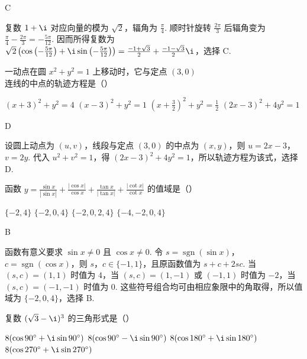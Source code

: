 \documentclass[UTF8,a4paper,oneside,11pt]{ctexbook}
\begin{document}
\begin{answer}
C
\end{answer}

\begin{solution}
复数 \(1+\i\) 对应向量的模为 \(\sqrt2\)，辐角为 \(\frac{\pi}{4}\). 顺时针旋转 \(\frac{2\pi}{3}\) 后辐角变为 \(\frac{\pi}{4}-\frac{2\pi}{3}=-\frac{5\pi}{12}\). 因而所得复数为
\(\sqrt2\left(\cos\left(-\frac{5\pi}{12}\right)+\i\sin\left(-\frac{5\pi}{12}\right)\right)=\frac{-1+\sqrt3}{2}+\frac{-1-\sqrt3}{2}\i\)，选择 C.
\end{solution}

\begin{problem}
一动点在圆 \(x^2+y^2=1\) 上移动时，它与定点 \((3,0)\) 连线的中点的轨迹方程是（\quad）

\choices
    {\((x+3)^2+y^2=4\)}
    {\((x-3)^2+y^2=1\)}
    {\(\left( x+\frac{3}{2} \right)^2+y^2=\frac{1}{2}\)}
    {\((2x-3)^2+4y^2=1\)}
\end{problem}

\begin{answer}
D
\end{answer}

\begin{solution}
设圆上动点为 \((u,v)\)，线段与定点 \((3,0)\) 的中点为 \((x,y)\)，则 \(u=2x-3\)，\(v=2y\). 代入 \(u^2+v^2=1\)，得 \((2x-3)^2+4y^2=1\)，所以轨迹方程为该式，选择 D.
\end{solution}

\begin{problem}
函数 \(y=\frac{\sin x}{|\sin x|}+\frac{|\cos x|}{\cos x}+\frac{\tan x}{|\tan x|}+\frac{|\cot x|}{\cot x}\) 的值域是（\quad）

\choices
    {\(\{-2,4\}\)}
    {\(\{-2,0,4\}\)}
    {\(\{-2,0,2,4\}\)}
    {\(\{-4,-2,0,4\}\)}
\end{problem}

\begin{answer}
B
\end{answer}

\begin{solution}
函数有意义要求 \(\sin x\ne0\) 且 \(\cos x\ne0\). 令 \(s=\operatorname{sgn}(\sin x)\)，\(c=\operatorname{sgn}(\cos x)\)，则 \(s\)，\(c\in\{-1,1\}\)，且原函数值为 \(s+c+2sc\). 当 \((s,c)=(1,1)\) 时值为 \(4\)，当 \((s,c)=(1,-1)\) 或 \((-1,1)\) 时值为 \(-2\)，当 \((s,c)=(-1,-1)\) 时值为 \(0\). 这些符号组合均可由相应象限中的角取得，所以值域为 \(\{-2,0,4\}\)，选择 B.
\end{solution}

\begin{problem}
复数 \((\sqrt{3}-\i)^3\) 的三角形式是（\quad）

\choices
    {\(8(\cos 90^\circ+\i\sin 90^\circ)\)}
    {\(8(\cos 90^\circ-\i\sin 90^\circ)\)}
    {\(8(\cos 180^\circ+\i\sin 180^\circ)\)}
    {\(8(\cos 270^\circ+\i\sin 270^\circ)\)}
\end{problem}
\end{document}
